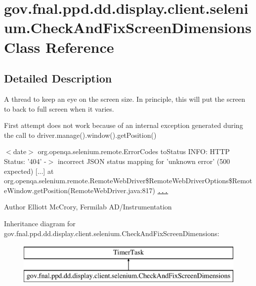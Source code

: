 \hypertarget{classgov_1_1fnal_1_1ppd_1_1dd_1_1display_1_1client_1_1selenium_1_1CheckAndFixScreenDimensions}{\section{gov.\-fnal.\-ppd.\-dd.\-display.\-client.\-selenium.\-Check\-And\-Fix\-Screen\-Dimensions Class Reference}
\label{classgov_1_1fnal_1_1ppd_1_1dd_1_1display_1_1client_1_1selenium_1_1CheckAndFixScreenDimensions}
}


\subsection{Detailed Description}
A thread to keep an eye on the screen size. In principle, this will put the screen to back to full screen when it varies.

First attempt does not work because of an internal exception generated during the call to driver.\-manage().window().get\-Position()
\begin{DoxyItemize}
\item $<$date$>$ org.\-openqa.\-selenium.\-remote.\-Error\-Codes to\-Status I\-N\-F\-O\-: H\-T\-T\-P Status\-: '404' -\/$>$ incorrect J\-S\-O\-N status mapping for 'unknown error' (500 expected) \mbox{[}...\mbox{]} at org.\-openqa.\-selenium.\-remote.\-Remote\-Web\-Driver\$\-Remote\-Web\-Driver\-Options\$\-Remote\-Window.\-get\-Position(Remote\-Web\-Driver.\-java\-:817) \href{And
Line 817 is not a valid line number in the library, somehow.}{\tt ...}
\end{DoxyItemize}

\begin{DoxyAuthor}{Author}
Elliott Mc\-Crory, Fermilab A\-D/\-Instrumentation 
\end{DoxyAuthor}
Inheritance diagram for gov.\-fnal.\-ppd.\-dd.\-display.\-client.\-selenium.\-Check\-And\-Fix\-Screen\-Dimensions\-:\begin{figure}[H]
\begin{center}
\leavevmode
\includegraphics[height=2.000000cm]{classgov_1_1fnal_1_1ppd_1_1dd_1_1display_1_1client_1_1selenium_1_1CheckAndFixScreenDimensions}
\end{center}
\end{figure}
